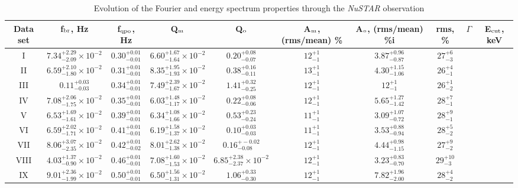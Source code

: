 \documentclass[a4paper,fleqn,usenatbib]{mnras}
\begin{document}
\begin{table}
\noindent
\centering
\caption{Evolution of the Fourier and energy spectrum properties through the {\it NuSTAR} observation}
\label{tab:timing}
\begin{tabular}{|c|c|c|c|c|c|c|c|c|c|}
\hline\hline
Data set & f$_{\rm br}$, Hz & f$_{\rm qpo}$, Hz & Q$_{\rm m}$ & Q$_{\rm o}$ & A$_{\rm m}$, (rms/mean) \% & A$_{\rm o}$, (rms/mean) \%i & rms, \% & $\Gamma$ & E$_{\rm cut}$, keV \\
\hline

I & $7.34_{-2.09}^{+2.29}\times10^{-2}$ & $0.30_{-0.01}^{+0.01}$ & $6.60_{-1.64}^{+1.67}\times10^{-2}$ & $0.20_{-0.07}^{+0.08}$ & $12_{-1}^{+1}$ & $3.87_{-0.87}^{+0.96}$ & $27_{-3}^{+6}$ & & \\
II & $6.59_{-1.80}^{+2.10}\times10^{-2}$ & $0.31_{-0.01}^{+0.01}$ & $8.35_{-1.93}^{+1.95}\times10^{-2}$ & $0.38_{-0.11}^{+0.16}$ & $13_{-1}^{+1}$ & $4.30_{-1.06}^{+1.15}$ & $26_{-1}^{+4}$ & & \\
III & $0.11_{-0.03}^{+0.03}$ & $0.34_{-0.01}^{+0.01}$ & $7.49_{-1.67}^{+2.39}\times10^{-2}$ & $1.41_{-0.25}^{+0.32}$ & $12_{-1}^{+1}$ & $12_{-1}^{+1}$ & $26_{-2}^{+1}$ & & \\
IV & $7.08_{-1.75}^{+2.06}\times10^{-2}$ & $0.35_{-0.01}^{+0.01}$ & $6.03_{-1.17}^{+1.48}\times10^{-2}$ & $0.22_{-0.06}^{+0.08}$ & $12_{-1}^{+1}$ & $5.65_{-1.42}^{+1.27}$ & $28_{-1}^{+7}$ & & \\
V & $6.53_{-1.61}^{+1.69}\times10^{-2}$ & $0.39_{-0.01}^{+0.01}$ & $6.34_{-1.66}^{+1.08}\times10^{-2}$ & $0.53_{-0.24}^{+0.23}$ & $11_{-1}^{+1}$ & $3.09_{-0.72}^{+1.07}$ & $28_{-1}^{+9}$ & & \\
VI & $6.59_{-1.71}^{+2.02}\times10^{-2}$ & $0.41_{-0.01}^{+0.01}$ & $6.19_{-1.37}^{+1.58}\times10^{-2}$ & $0.10_{-0.03}^{+0.03}$ & $11_{-1}^{+1}$ & $3.53_{-0.94}^{+0.88}$ & $28_{-2}^{+5}$ & & \\
VII & $8.06_{-2.35}^{+3.07}\times10^{-2}$ & $0.42_{-0.02}^{+0.01}$ & $8.01_{-1.38}^{+2.62}\times10^{-2}$ & $0.16_{-0.08}^{+-0.02}$ & $12_{-1}^{+1}$ & $4.44_{-1.15}^{+0.98}$ & $27_{-2}^{+9}$ & & \\
VIII & $4.03_{-0.90}^{+1.37}\times10^{-2}$ & $0.46_{-0.01}^{+0.01}$ & $7.08_{-1.53}^{+1.60}\times10^{-2}$ & $6.85_{-2.37}^{+2.38}\times10^{-2}$ & $12_{-1}^{+1}$ & $3.23_{-0.70}^{+0.83}$ & $29_{-3}^{+10}$ & & \\
IX & $9.01_{-1.99}^{+2.36}\times10^{-2}$ & $0.50_{-0.01}^{+0.01}$ & $6.50_{-1.31}^{+1.56}\times10^{-2}$ & $1.06_{-0.30}^{+0.33}$ & $12_{-1}^{+1}$ & $7.82_{-2.00}^{+1.96}$ & $28_{-2}^{+4}$ & & \\

\end{tabular}
\end{table}
\end{document}
